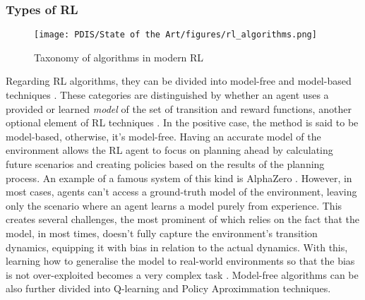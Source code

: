 \documentclass[11pt,a4paper]{article}
\begin{document}
\subsubsection{Types of \ac{RL}}


\begin{figure}
    \centering
    \texttt{[image: PDIS/State of the Art/figures/rl\_algorithms.png]}
    \caption{Taxonomy of algorithms in modern \ac{RL} \cite{openaiSpinningDocumentation}}
    \label{fig:rl-algorithms}
\end{figure}

Regarding \ac{RL} algorithms, they can be divided into model-free and model-based techniques \cite{openaiSpinningDocumentation}. These categories are distinguished by whether an agent uses a provided or learned \textit{model} of the set of transition and reward functions, another optional element of \ac{RL} techniques \cite{moralesGrokkingDeepReinforcement2020, openaiSpinningDocumentation}. In the positive case, the method is said to be model-based, otherwise, it's model-free. Having an accurate model of the environment allows the \ac{RL} agent to focus on planning ahead by calculating future scenarios and creating policies based on the results of the planning process. An example of a famous system of this kind is AlphaZero \cite{silverMasteringChessShogi2017}. However, in most cases, agents can't access a ground-truth model of the environment, leaving only the scenario where an agent learns a model purely from experience. This creates several challenges, the most prominent of which relies on the fact that the model, in most times, doesn't fully capture the environment's transition dynamics, equipping it with bias in relation to the actual dynamics. With this, learning how to generalise the model to real-world environments so that the bias is not over-exploited becomes a very complex task \cite{openaiSpinningDocumentation}.  Model-free algorithms can be also further divided into Q-learning and Policy Aproximmation techniques. \par
\end{document}
